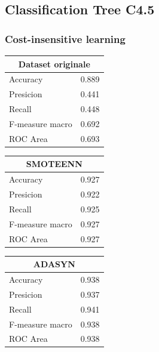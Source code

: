 \documentclass[italian,12pt,a4paper]{article}
\begin{document}
	
	\subsection{Classification Tree C4.5}
	
	\subsubsection{Cost-insensitive learning}

	
	\begin{center}
	
	   \begin{table}[h]
		\footnotesize
		\begin{tabular}{|p{2cm}|c|}
			\hline
			\multicolumn{2}{|c|}{Dataset originale}\\ \hline
				Accuracy & 0.889 \\ \hline
				Presicion & 0.441 \\ \hline
				Recall & 0.448 \\ \hline
				F-measure macro & 0.692 \\ \hline
				ROC Area & 0.693 \\ \hline
		\end{tabular}
		\hfill
		\begin{tabular}{|p{2cm}|c|}
			\hline
			\multicolumn{2}{|c|}{SMOTEENN}\\ \hline
				Accuracy & 0.927 \\ \hline
				Presicion & 0.922 \\ \hline
				Recall & 0.925 \\ \hline
				F-measure macro & 0.927 \\ \hline
				ROC Area & 0.927 \\ \hline  
		\end{tabular}
		\hfill
		\begin{tabular}{|p{2cm}|r|} \hline
			\multicolumn{2}{|c|}{ADASYN}\\ \hline
				Accuracy & 0.938 \\ \hline
				Presicion & 0.937 \\ \hline
				Recall & 0.941 \\ \hline
				F-measure macro & 0.938 \\ \hline
				ROC Area & 0.938 \\ \hline  
		\end{tabular}
	\end{table}
	

\end{center}
\end{document}
